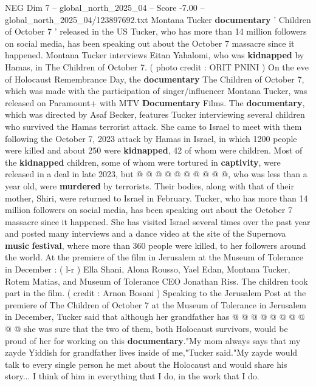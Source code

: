 \begin{textsample}{NEG Dim 7 – global\_north\_2025\_04 – Score -7.00 – global\_north\_2025\_04/123897692.txt}  \label{ex:f7_neg_095}
Montana Tucker \textbf{documentary} ' Children of October 7 ' released in the US Tucker, who has more than 14 million followers on social media, has been speaking out about the October 7 massacre since it happened.
Montana Tucker interviews Eitan Yahalomi, who was \textbf{kidnapped} by Hamas, in The Children of October 7. ( photo credit : ORIT PNINI ) On the eve of Holocaust Remembrance Day, the \textbf{documentary} The Children of October 7, which was made with the participation of singer/influencer Montana Tucker, was released on Paramount+ with MTV \textbf{Documentary} Films.
The \textbf{documentary}, which was directed by Asaf Becker, features Tucker interviewing several children who survived the Hamas terrorist attack.
She came to Israel to meet with them following the October 7, 2023 attack by Hamas in Israel, in which 1200 people were killed and about 250 were \textbf{kidnapped}, 42 of whom were children.
Most of the \textbf{kidnapped} children, some of whom were tortured in \textbf{captivity}, were released in a deal in late 2023, but @ @ @ @ @ @ @ @ @ @, who was less than a year old, were \textbf{murdered} by terrorists.
Their bodies, along with that of their mother, Shiri, were returned to Israel in February.
Tucker, who has more than 14 million followers on social media, has been speaking out about the October 7 massacre since it happened.
She has visited Israel several times over the past year and posted many interviews and a dance video at the site of the Supernova \textbf{music} \textbf{festival}, where more than 360 people were killed, to her followers around the world.
At the premiere of the film in Jerusalem at the Museum of Tolerance in December : ( l-r ) Ella Shani, Alona Rousso, Yael Edan, Montana Tucker, Rotem Matias, and Museum of Tolerance CEO Jonathan Riss.
The children took part in the film. ( credit : Arnon Bosani ) Speaking to the Jerusalem Post at the premiere of The Children of October 7 at the Museum of Tolerance in Jerusalem in December, Tucker said that although her grandfather has @ @ @ @ @ @ @ @ @ @ she was sure that the two of them, both Holocaust survivors, would be proud of her for working on this \textbf{documentary}."My mom always says that my zayde Yiddish for grandfather lives inside of me,"Tucker said."My zayde would talk to every single person he met about the Holocaust and would share his story...
I think of him in everything that I do, in the work that I do.

\end{textsample}
